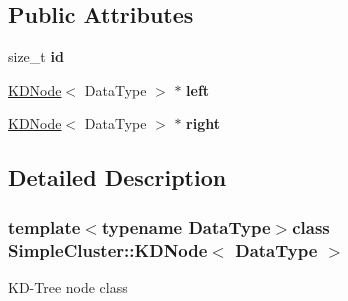 \subsection*{Public Attributes}
\begin{DoxyCompactItemize}
\item 
\hypertarget{classSimpleCluster_1_1KDNode_a52213b503b615e0bef3c2b636ddd0095}{size\-\_\-t {\bfseries id}}\label{classSimpleCluster_1_1KDNode_a52213b503b615e0bef3c2b636ddd0095}

\item 
\hypertarget{classSimpleCluster_1_1KDNode_ad9f90c910bc2fb96fc9b2c3710d89381}{\hyperlink{classSimpleCluster_1_1KDNode}{K\-D\-Node}$<$ Data\-Type $>$ $\ast$ {\bfseries left}}\label{classSimpleCluster_1_1KDNode_ad9f90c910bc2fb96fc9b2c3710d89381}

\item 
\hypertarget{classSimpleCluster_1_1KDNode_a5e6c93ee710a457cf8d92afc86ffc13f}{\hyperlink{classSimpleCluster_1_1KDNode}{K\-D\-Node}$<$ Data\-Type $>$ $\ast$ {\bfseries right}}\label{classSimpleCluster_1_1KDNode_a5e6c93ee710a457cf8d92afc86ffc13f}

\end{DoxyCompactItemize}


\subsection{Detailed Description}
\subsubsection*{template$<$typename Data\-Type$>$class Simple\-Cluster\-::\-K\-D\-Node$<$ Data\-Type $>$}

K\-D-\/\-Tree node class 

